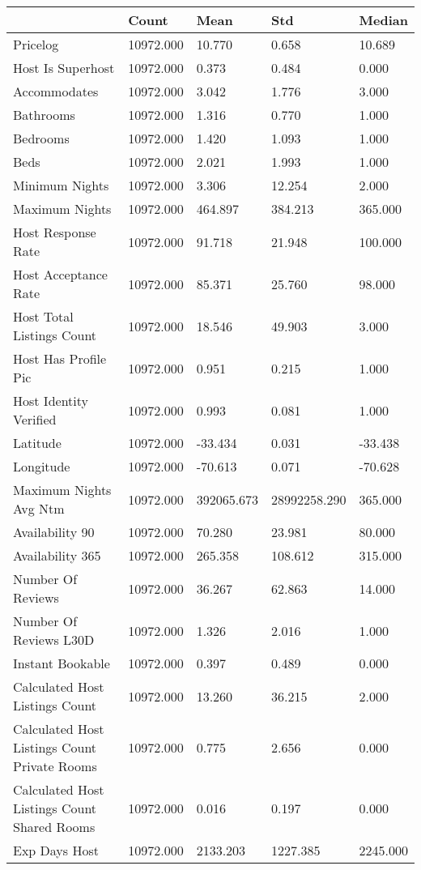 \begin{tabular}{lllll}
\toprule
 & Count & Mean & Std & Median \\
\midrule
Pricelog & 10972.000 & 10.770 & 0.658 & 10.689 \\
Host Is Superhost & 10972.000 & 0.373 & 0.484 & 0.000 \\
Accommodates & 10972.000 & 3.042 & 1.776 & 3.000 \\
Bathrooms & 10972.000 & 1.316 & 0.770 & 1.000 \\
Bedrooms & 10972.000 & 1.420 & 1.093 & 1.000 \\
Beds & 10972.000 & 2.021 & 1.993 & 1.000 \\
Minimum Nights & 10972.000 & 3.306 & 12.254 & 2.000 \\
Maximum Nights & 10972.000 & 464.897 & 384.213 & 365.000 \\
Host Response Rate & 10972.000 & 91.718 & 21.948 & 100.000 \\
Host Acceptance Rate & 10972.000 & 85.371 & 25.760 & 98.000 \\
Host Total Listings Count & 10972.000 & 18.546 & 49.903 & 3.000 \\
Host Has Profile Pic & 10972.000 & 0.951 & 0.215 & 1.000 \\
Host Identity Verified & 10972.000 & 0.993 & 0.081 & 1.000 \\
Latitude & 10972.000 & -33.434 & 0.031 & -33.438 \\
Longitude & 10972.000 & -70.613 & 0.071 & -70.628 \\
Maximum Nights Avg Ntm & 10972.000 & 392065.673 & 28992258.290 & 365.000 \\
Availability 90 & 10972.000 & 70.280 & 23.981 & 80.000 \\
Availability 365 & 10972.000 & 265.358 & 108.612 & 315.000 \\
Number Of Reviews & 10972.000 & 36.267 & 62.863 & 14.000 \\
Number Of Reviews L30D & 10972.000 & 1.326 & 2.016 & 1.000 \\
Instant Bookable & 10972.000 & 0.397 & 0.489 & 0.000 \\
Calculated Host Listings Count & 10972.000 & 13.260 & 36.215 & 2.000 \\
Calculated Host Listings Count Private Rooms & 10972.000 & 0.775 & 2.656 & 0.000 \\
Calculated Host Listings Count Shared Rooms & 10972.000 & 0.016 & 0.197 & 0.000 \\
Exp Days Host & 10972.000 & 2133.203 & 1227.385 & 2245.000 \\

\end{tabular}
